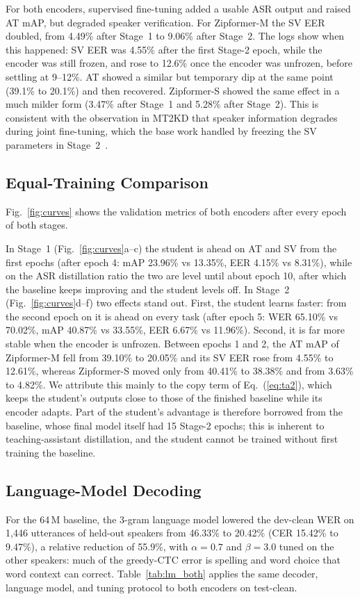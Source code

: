 \documentclass[lettersize,journal]{IEEEtran}
\begin{document}
For both encoders, supervised fine-tuning added a usable ASR output and raised AT mAP, but degraded speaker
verification. For Zipformer-M the SV EER doubled, from 4.49\% after Stage~1 to 9.06\% after Stage~2. The logs show
when this happened: SV EER was 4.55\% after the first Stage-2 epoch, while the encoder was still frozen, and rose to
12.6\% once the encoder was unfrozen, before settling at 9--12\%. AT showed a similar but temporary dip at the same
point (39.1\% to 20.1\%) and then recovered. Zipformer-S showed the same effect in a much milder form (3.47\% after
Stage~1 and 5.28\% after Stage~2). This is consistent with the observation in MT2KD that speaker information degrades
during joint fine-tuning, which the base work handled by freezing the SV parameters in Stage~2~\cite{yang2025mt2kd}.

\subsection{Equal-Training Comparison}
Fig.~\ref{fig:curves} shows the validation metrics of both encoders after every epoch of both stages.



In Stage~1 (Fig.~\ref{fig:curves}a--c) the student is ahead on AT and SV from the first epochs (after epoch 4:
mAP 23.96\% vs 13.35\%, EER 4.15\% vs 8.31\%), while on the ASR distillation ratio the two are level until about
epoch 10, after which the baseline keeps improving and the student levels off. In Stage~2 (Fig.~\ref{fig:curves}d--f) two effects stand out. First, the student learns faster: from the second epoch on it is ahead on every task (after epoch 5: WER 65.10\% vs 70.02\%, mAP 40.87\% vs 33.55\%, EER 6.67\% vs 11.96\%).
Second, it is far more stable when the encoder is unfrozen. Between epochs 1 and 2, the AT mAP of Zipformer-M fell
from 39.10\% to 20.05\% and its SV EER rose from 4.55\% to 12.61\%, whereas Zipformer-S moved only from 40.41\% to
38.38\% and from 3.63\% to 4.82\%. We attribute this mainly to the copy term of Eq.~(\ref{eq:ta2}), which keeps the
student's outputs close to those of the finished baseline while its encoder adapts. Part of the student's advantage
is therefore borrowed from the baseline, whose final model itself had 15 Stage-2 epochs; this is inherent to
teaching-assistant distillation, and the student cannot be trained without first training the baseline.

\subsection{Language-Model Decoding}
For the 64\,M baseline, the 3-gram language model lowered the dev-clean WER on 1,446 utterances of held-out speakers
from 46.33\% to 20.42\% (CER 15.42\% to 9.47\%), a relative reduction of 55.9\%, with $\alpha=0.7$ and $\beta=3.0$
tuned on the other speakers: much of the greedy-CTC error is spelling and word choice that word context can correct.
Table~\ref{tab:lm_both} applies the same decoder, language model, and tuning protocol to both encoders on test-clean.
\end{document}
